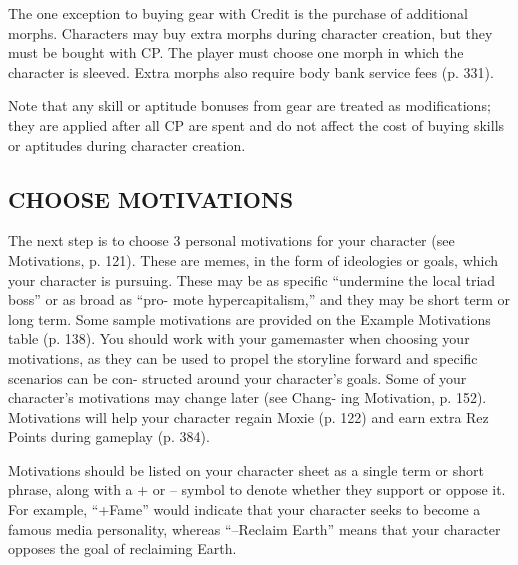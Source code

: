 The one exception to buying gear with Credit is
the purchase of additional morphs. Characters may
buy extra morphs during character creation, but they
must be bought with CP. The player must choose
one morph in which the character is sleeved. Extra
morphs also require body bank service fees (p. 331).

Note that any skill or aptitude bonuses from gear
are treated as modifications; they are applied after
all CP are spent and do not affect the cost of buying
skills or aptitudes during character creation.

\subsection{CHOOSE MOTIVATIONS}
The next step is to choose 3 personal motivations
 for your character (see Motivations, p. 121). These
 are memes, in the form of ideologies or goals, which
your character is pursuing. These may be as specific
“undermine the local triad boss” or as broad as “pro-
 mote hypercapitalism,” and they may be short term
 or long term. Some sample motivations are provided
 on the Example Motivations table (p. 138). You
 should work with your gamemaster when choosing
your motivations, as they can be used to propel the
 storyline forward and specific scenarios can be con-
 structed around your character’s goals. Some of your
 character’s motivations may change later (see Chang-
 ing Motivation, p. 152). Motivations will help your
 character regain Moxie (p. 122) and earn extra Rez
 Points during gameplay (p. 384).

 Motivations should be listed on your character
 sheet as a single term or short phrase, along with a +
 or – symbol to denote whether they support or oppose
 it. For example, “+Fame” would indicate that your
 character seeks to become a famous media personality,
 whereas “–Reclaim Earth” means that your character
 opposes the goal of reclaiming Earth.


